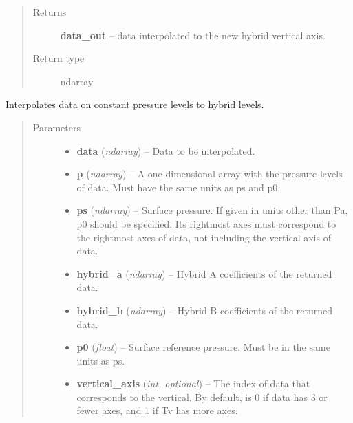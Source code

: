 \documentclass[letterpaper,10pt,english]{sphinxmanual}
\begin{document}
\begin{fulllineitems}
\begin{quote}
\begin{description}
\begin{itemize}
\end{itemize}

\item[{Returns}] \leavevmode
\textbf{data\_out} --
data interpolated to the new hybrid vertical axis.

\item[{Return type}] \leavevmode
ndarray

\end{description}\end{quote}

\end{fulllineitems}


\begin{fulllineitems}
\label{atmos:atmos.util.isobaric_to_hybrid}
Interpolates data on constant pressure levels to hybrid levels.
\begin{quote}\begin{description}
\item[{Parameters}] \leavevmode\begin{itemize}
\item {} 
\textbf{data} (\emph{ndarray}) -- Data to be interpolated.

\item {} 
\textbf{p} (\emph{ndarray}) -- A one-dimensional array with the pressure levels of data. Must have
the same units as ps and p0.

\item {} 
\textbf{ps} (\emph{ndarray}) -- Surface pressure. If given in units other than Pa, p0 should be
specified. Its rightmost axes must correspond to the rightmost axes
of data, not including the vertical axis of data.

\item {} 
\textbf{hybrid\_a} (\emph{ndarray}) -- Hybrid A coefficients of the returned data.

\item {} 
\textbf{hybrid\_b} (\emph{ndarray}) -- Hybrid B coefficients of the returned data.

\item {} 
\textbf{p0} (\emph{float}) -- Surface reference pressure. Must be in the same units as ps.

\item {} 
\textbf{vertical\_axis} (\emph{int, optional}) -- The index of data that corresponds to the vertical. By default, is 0 if
data has 3 or fewer axes, and 1 if Tv has more axes.


\end{itemize}
\end{description}
\end{quote}
\end{fulllineitems}
\end{document}
